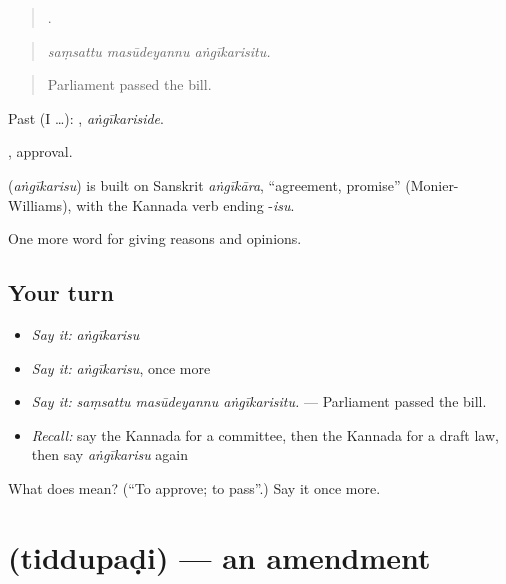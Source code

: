 \begin{quote}
  .
\end{quote}

\begin{quote}
\emph{saṃsattu masūdeyannu aṅgīkarisitu.}
\end{quote}

\begin{quote}
Parliament passed the bill.
\end{quote}

Past (I …): , \emph{aṅgīkariside}.

, approval.

\begin{cousinweb}
\textbf{} (\emph{aṅgīkarisu}) is built on Sanskrit \emph{aṅgīkāra}, \textquotedblleft{}agreement, promise\textquotedblright{} (Monier-Williams), with the Kannada verb ending -\emph{isu}.
\end{cousinweb}

\begin{grammarlens}[title={What you've built}]
One more word for giving reasons and opinions.
\end{grammarlens}

\subsection*{Your turn}
\begin{itemize}
\raggedright
  \item \emph{Say it:} \emph{aṅgīkarisu}
  \item \emph{Say it:} \emph{aṅgīkarisu}, once more
  \item \emph{Say it:} \emph{saṃsattu masūdeyannu aṅgīkarisitu.} — Parliament passed the bill.
  \item \emph{Recall:} say the Kannada for a committee, then the Kannada for a draft law, then say \emph{aṅgīkarisu} again
\end{itemize}

\begin{tcolorbox}[breakable,colback=teal!4,colframe=teal!35!black,title={Before you move on}]
What does  mean? (\textquotedblleft{}To approve; to pass\textquotedblright{}.) Say it once more.
\end{tcolorbox}
\section[\texorpdfstring{\kn{ತಿದ್ದುಪಡಿ} (tiddupaḍi)}{ತಿದ್ದುಪಡಿ (tiddupaḍi)}]{ (tiddupaḍi) — an amendment}

